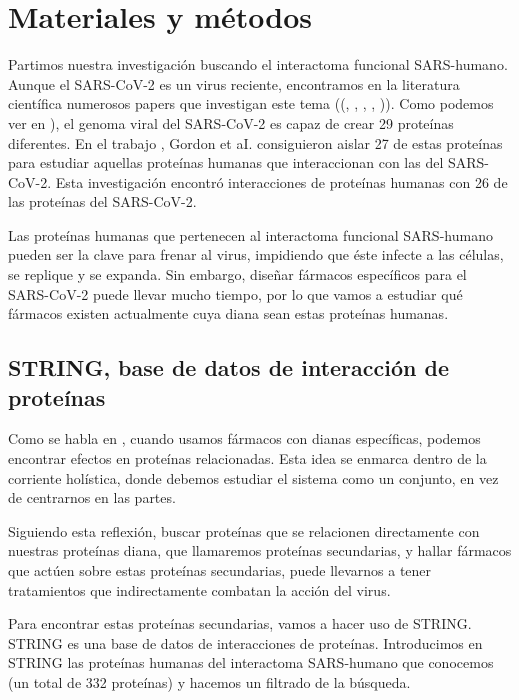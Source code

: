 \section{Materiales y métodos}

Partimos nuestra investigación buscando el interactoma funcional SARS-humano. Aunque el SARS-CoV-2 es un virus reciente, encontramos en la literatura científica numerosos papers que investigan este tema ((\cite{Hoffmann2020}, \cite{Yan2020a}, \cite{Shulla2011}, \cite{Chan2020}, \cite{Gysi2020})). Como podemos ver en \cite{Gysi2020}), el genoma viral del SARS-CoV-2 es capaz de crear 29 proteínas diferentes. En el trabajo \cite{Shulla2011}, Gordon et aI. consiguieron aislar 27 de estas proteínas para estudiar aquellas proteínas humanas que interaccionan con las del SARS-CoV-2. Esta investigación encontró interacciones de proteínas humanas con 26 de las proteínas del SARS-CoV-2. 

Las proteínas humanas que pertenecen al interactoma funcional SARS-humano pueden ser la clave para frenar al virus, impidiendo que éste infecte a las células, se replique y se expanda. Sin embargo, diseñar fármacos específicos para el SARS-CoV-2 puede llevar mucho tiempo, por lo que vamos a estudiar qué fármacos existen actualmente cuya diana sean estas proteínas humanas. 

\subsection{STRING, base de datos de interacción de proteínas}

Como se habla en \cite{Chan2020}, cuando usamos fármacos con dianas específicas, podemos encontrar efectos en proteínas relacionadas. Esta idea se enmarca dentro de la corriente holística, donde debemos estudiar el sistema como un conjunto, en vez de centrarnos en las partes. 

Siguiendo esta reflexión, buscar proteínas que se relacionen directamente con nuestras proteínas diana, que llamaremos proteínas secundarias, y hallar fármacos que actúen sobre estas proteínas secundarias, puede llevarnos a tener tratamientos que indirectamente combatan la acción del virus. 

Para encontrar estas proteínas secundarias, vamos a hacer uso de STRING. STRING es una base de datos de interacciones de proteínas. Introducimos en STRING las proteínas humanas del interactoma SARS-humano que conocemos (un total de 332 proteínas) y hacemos un filtrado de la búsqueda. 

